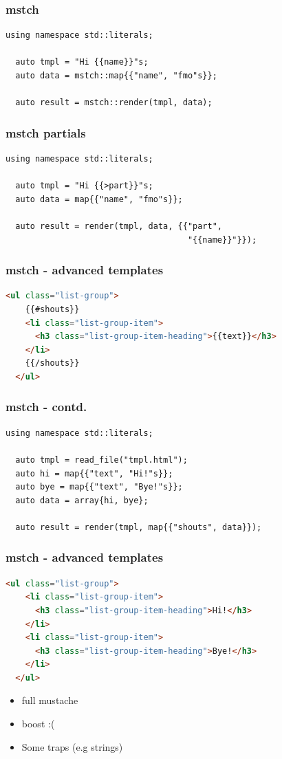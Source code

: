 \begin{frame}[fragile]
  \frametitle{mstch}
  \begin{lstlisting}[language={[11]C++}]
  using namespace std::literals;

  auto tmpl = "Hi {{name}}"s;
  auto data = mstch::map{{"name", "fmo"s}};

  auto result = mstch::render(tmpl, data);
  \end{lstlisting}
\end{frame}
\begin{frame}[fragile]
  \frametitle{mstch partials}
  \begin{lstlisting}[language={[11]C++}]
  using namespace std::literals;

  auto tmpl = "Hi {{>part}}"s;
  auto data = map{{"name", "fmo"s}};

  auto result = render(tmpl, data, {{"part",
                                     "{{name}}"}});
  \end{lstlisting}
\end{frame}
\begin{frame}[fragile]
  \frametitle{mstch - advanced templates}
  \begin{lstlisting}[language=html]
  <ul class="list-group">
    {{#shouts}}
    <li class="list-group-item">
      <h3 class="list-group-item-heading">{{text}}</h3>
    </li>
    {{/shouts}}
  </ul>
  \end{lstlisting}
\end{frame}
\begin{frame}[fragile]
  \frametitle{mstch - contd.}
  \begin{lstlisting}[language={[11]C++}]
  using namespace std::literals;

  auto tmpl = read_file("tmpl.html");
  auto hi = map{{"text", "Hi!"s}};
  auto bye = map{{"text", "Bye!"s}};
  auto data = array{hi, bye};

  auto result = render(tmpl, map{{"shouts", data}});
  \end{lstlisting}
\end{frame}
\begin{frame}[fragile]
  \frametitle{mstch - advanced templates}
  \begin{lstlisting}[language=html]
  <ul class="list-group">
    <li class="list-group-item">
      <h3 class="list-group-item-heading">Hi!</h3>
    </li>
    <li class="list-group-item">
      <h3 class="list-group-item-heading">Bye!</h3>
    </li>
  </ul>
  \end{lstlisting}
\end{frame}
\begin{frame}
  \begin{itemize}
    \item full mustache
    \item boost :(
    \item Some traps (e.g strings)
  \end{itemize}
\end{frame}
